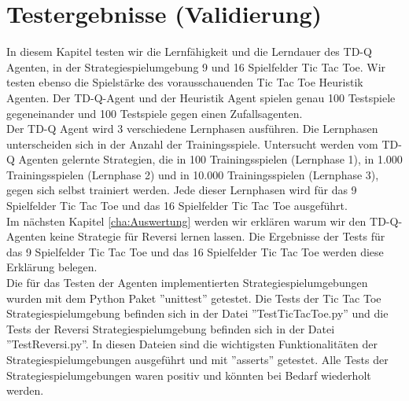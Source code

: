 \chapter{Testergebnisse (Validierung)}
\label{cha:Validierung}

In diesem Kapitel testen wir die Lernfähigkeit und die Lerndauer des TD-Q Agenten, in der Strategiespielumgebung 9 und 16 Spielfelder Tic Tac Toe. Wir testen ebenso die Spielstärke des vorausschauenden Tic Tac Toe Heuristik Agenten. Der TD-Q-Agent und der Heuristik Agent spielen genau 100 Testspiele gegeneinander und 100 Testspiele gegen einen Zufallsagenten. \\

Der TD-Q Agent wird 3 verschiedene Lernphasen ausführen. Die Lernphasen unterscheiden sich in der Anzahl der Trainingsspiele. Untersucht werden vom TD-Q Agenten gelernte Strategien, die in 100 Trainingsspielen (Lernphase 1), in 1.000 Trainingsspielen (Lernphase 2) und in 10.000 Trainingsspielen (Lernphase 3), gegen sich selbst trainiert werden. Jede dieser Lernphasen wird für das 9 Spielfelder Tic Tac Toe und das 16 Spielfelder Tic Tac Toe ausgeführt. \\

Im nächsten Kapitel \ref{cha:Auswertung} werden wir erklären warum wir den TD-Q-Agenten keine Strategie für Reversi lernen lassen. Die Ergebnisse der Tests für das 9 Spielfelder Tic Tac Toe und das 16 Spielfelder Tic Tac Toe werden diese Erklärung belegen. \\

Die für das Testen der Agenten implementierten Strategiespielumgebungen wurden mit dem Python Paket ''unittest'' getestet. Die Tests der Tic Tac Toe Strategiespielumgebung befinden sich in der Datei ''TestTicTacToe.py'' und die Tests der Reversi Strategiespielumgebung befinden sich in der Datei ''TestReversi.py''. In diesen Dateien sind die wichtigsten Funktionalitäten der Strategiespielumgebungen ausgeführt und mit ''asserts'' getestet. Alle Tests der Strategiespielumgebungen waren positiv und könnten bei Bedarf wiederholt werden. \\

